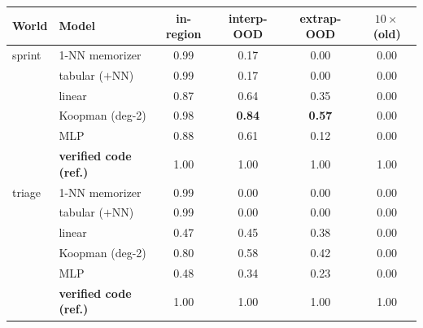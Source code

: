 \begin{tabular}{llcccc}
\toprule
World & Model & in-region & interp-OOD & extrap-OOD & $10\times$ (old) \\
\midrule
sprint & 1-NN memorizer & 0.99 & 0.17 & 0.00 & 0.00 \\
 & tabular ($+$NN) & 0.99 & 0.17 & 0.00 & 0.00 \\
 & linear & 0.87 & 0.64 & 0.35 & 0.00 \\
 & Koopman (deg-2) & 0.98 & \textbf{0.84} & \textbf{0.57} & 0.00 \\
 & MLP & 0.88 & 0.61 & 0.12 & 0.00 \\
 & \textbf{verified code (ref.)} & 1.00 & 1.00 & 1.00 & 1.00 \\
\midrule
triage & 1-NN memorizer & 0.99 & 0.00 & 0.00 & 0.00 \\
 & tabular ($+$NN) & 0.99 & 0.00 & 0.00 & 0.00 \\
 & linear & 0.47 & 0.45 & 0.38 & 0.00 \\
 & Koopman (deg-2) & 0.80 & 0.58 & 0.42 & 0.00 \\
 & MLP & 0.48 & 0.34 & 0.23 & 0.00 \\
 & \textbf{verified code (ref.)} & 1.00 & 1.00 & 1.00 & 1.00 \\
\bottomrule
\end{tabular}

